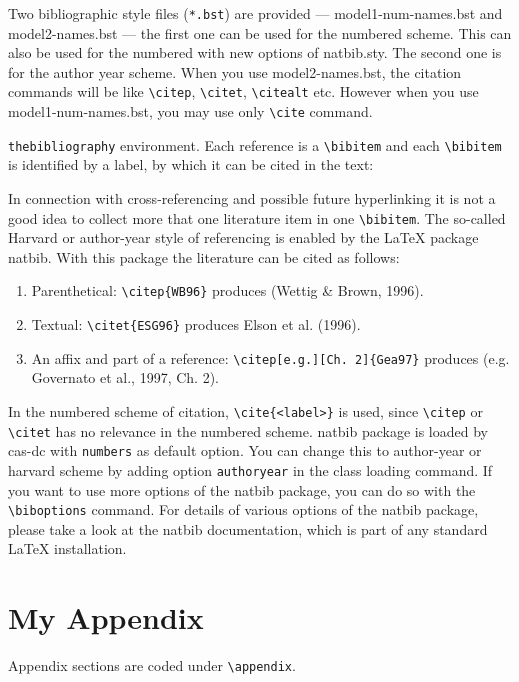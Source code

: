 \documentclass[a4paper,fleqn]{cas-dc}
\begin{document}
Two bibliographic style files (\verb+*.bst+) are provided ---
{model1-num-names.bst} and {model2-names.bst} --- the first one can be
used for the numbered scheme. This can also be used for the numbered
with new options of {natbib.sty}. The second one is for the author year
scheme. When  you use model2-names.bst, the citation commands will be
like \verb+\citep+,  \verb+\citet+, \verb+\citealt+ etc. However when
you use model1-num-names.bst, you may use only \verb+\cite+ command.

\verb+thebibliography+ environment.  Each reference is a\linebreak
\verb+\bibitem+ and each \verb+\bibitem+ is identified by a label,
by which it can be cited in the text:

\noindent In connection with cross-referencing and
possible future hyperlinking it is not a good idea to collect
more that one literature item in one \verb+\bibitem+.  The
so-called Harvard or author-year style of referencing is enabled
by the \LaTeX{} package {natbib}. With this package the
literature can be cited as follows:

\begin{enumerate}[(1)]
\item Parenthetical: \verb+\citep{WB96}+ produces (Wettig \& Brown, 1996).
\item Textual: \verb+\citet{ESG96}+ produces Elson et al. (1996).
\item An affix and part of a reference:\break
\verb+\citep[e.g.][Ch. 2]{Gea97}+ produces (e.g. Governato et
al., 1997, Ch. 2).
\end{enumerate}

In the numbered scheme of citation, \verb+\cite{<label>}+ is used,
since \verb+\citep+ or \verb+\citet+ has no relevance in the numbered
scheme.  {natbib} package is loaded by {cas-dc} with
\verb+numbers+ as default option.  You can change this to author-year
or harvard scheme by adding option \verb+authoryear+ in the class
loading command.  If you want to use more options of the {natbib}
package, you can do so with the \verb+\biboptions+ command.  For
details of various options of the {natbib} package, please take a
look at the {natbib} documentation, which is part of any standard
\LaTeX{} installation.

\appendix
\section{My Appendix}
Appendix sections are coded under \verb+\appendix+.
\end{document}
